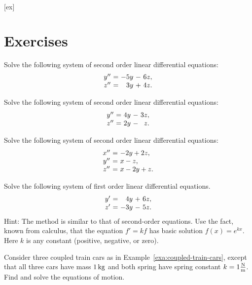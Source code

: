 [ex]
\section*{Exercises}


\begin{ex}
  Solve the following system of second order linear differential equations:
  \begin{equation*}
    \begin{array}{c@{~}c@{~}r@{~}r@{~}r}
      y'' &=& -5y &-& 6z, \\
      z'' &=& 3y &+& 4z. \\
    \end{array}
  \end{equation*}
\end{ex}  
  
\begin{ex}
  Solve the following system of second order linear differential equations:
  \begin{equation*}
    \begin{array}{c@{~}c@{~}r@{~}r@{~}r}
      y'' &=& 4y &-& 3z, \\
      z'' &=& 2y &-& z. \\
    \end{array}
  \end{equation*}
\end{ex}  
  
\begin{ex}
  Solve the following system of second order linear differential equations:
  \begin{equation*}
    \begin{array}{c@{~}c@{~}l}
      x'' &=& -2y + 2z, \\
      y'' &=& x - z, \\
      z'' &=& x - 2y + z. \\
    \end{array}
  \end{equation*}
\end{ex}

\begin{ex}
  Solve the following system of first order linear differential equations.
  \begin{equation*}
    \begin{array}{c@{~}c@{~}r@{~}r@{~}r}
      y' &=& 4y &+& 6z, \\
      z' &=& -3y &-& 5z. \\
    \end{array}
  \end{equation*}
  Hint: The method is similar to that of second-order equations. Use
  the fact, known from calculus, that the equation $f'=kf$ has basic
  solution $f(x) = e^{kx}$. Here $k$ is any constant (positive,
  negative, or zero). 
\end{ex}

\begin{ex}
  Consider three coupled train cars as in
  Example~\ref{exa:coupled-train-cars}, except that all three cars
  have mass $1\mathop{\textrm{\rm kg}}\nolimits$ and both spring have spring constant
  $k=1\frac{\mathop{\textrm{\rm N}}\nolimits}{\mathop{\textrm{\rm m}}\nolimits}$. Find and solve the equations of motion.
\end{ex}


